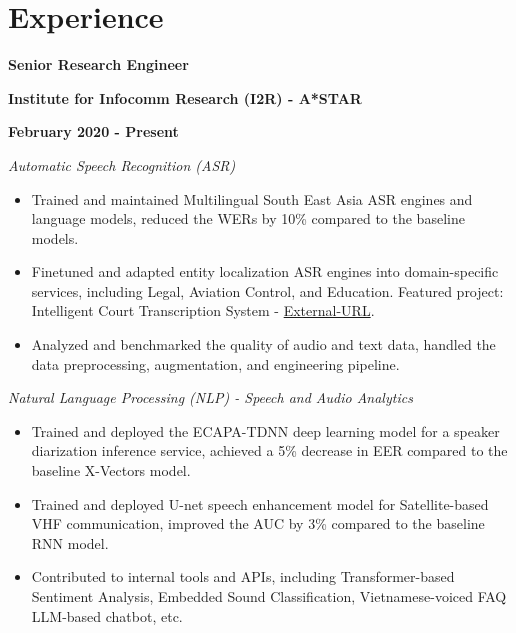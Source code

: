 \section{Experience}
\vspace{-2mm}

\begin{multicols}{3}
    \begin{flushleft}
        \textbf{Senior Research Engineer}
    \end{flushleft}

    \columnbreak

    \begin{center}
        \textbf{Institute for Infocomm Research (I2R) - A*STAR}
    \end{center}

    \columnbreak

    \begin{flushright}
        \textbf{February 2020 - Present}
    \end{flushright}
\end{multicols}

\vspace{-5mm}

\emph{Automatic Speech Recognition (ASR)}
\vspace{-2.5mm}
\begin{itemize}[noitemsep]
    \item Trained and maintained Multilingual South East Asia ASR engines and language models, reduced the WERs by 10\% compared to the baseline models.
    \item Finetuned and adapted entity localization ASR engines into domain-specific services, including Legal, Aviation Control, and Education. Featured project: Intelligent Court Transcription System - \href{https://www.straitstimes.com/singapore/courts-crime/state-courts-to-use-system-that-instantly-transcribes-court-proceedings}{External-URL}.
    \item Analyzed and benchmarked the quality of audio and text data, handled the data preprocessing, augmentation, and engineering pipeline.
\end{itemize}

\emph{Natural Language Processing (NLP) - Speech and Audio Analytics}
\vspace{-2.5mm}
\begin{itemize}[noitemsep]
    \item Trained and deployed the ECAPA-TDNN deep learning model for a speaker diarization inference service, achieved a 5\% decrease in EER compared to the baseline X-Vectors model.
    \item Trained and deployed U-net speech enhancement model for Satellite-based VHF communication, improved the AUC by 3\% compared to the baseline RNN model.
    \item Contributed to internal tools and APIs, including Transformer-based Sentiment Analysis, Embedded Sound Classification, Vietnamese-voiced FAQ LLM-based chatbot, etc.
\end{itemize}

